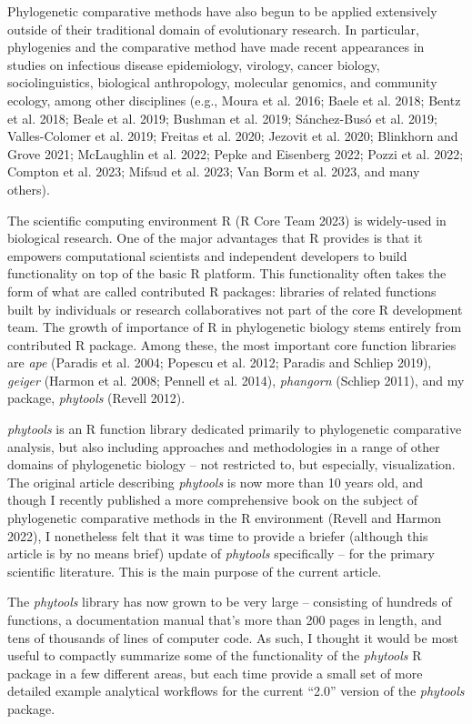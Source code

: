\documentclass[fleqn,10pt,lineno]{wlpeerj} %
\begin{document}
Phylogenetic comparative methods have also begun to be applied extensively outside of their traditional domain of evolutionary research. In particular, phylogenies and the comparative method have made recent appearances in studies on infectious disease epidemiology, virology, cancer biology, sociolinguistics, biological anthropology, molecular genomics, and community ecology, among other disciplines (e.g., Moura et al. 2016; Baele et al. 2018; Bentz et al. 2018; Beale et al. 2019; Bushman et al. 2019; Sánchez-Busó et al. 2019; Valles-Colomer et al. 2019; Freitas et al. 2020; Jezovit et al. 2020; Blinkhorn and Grove 2021; McLaughlin et al. 2022; Pepke and Eisenberg 2022; Pozzi et al. 2022; Compton et al. 2023; Mifsud et al. 2023; Van Borm et al. 2023, and many others).

The scientific computing environment R (R Core Team 2023) is widely-used in biological research. One of the major advantages that R provides is that it empowers computational scientists and independent developers to build functionality on top of the basic R platform. This functionality often takes the form of what are called contributed R packages: libraries of related functions built by individuals or research collaboratives not part of the core R development team. The growth of importance of R in phylogenetic biology stems entirely from contributed R package. Among these, the most important core function libraries are \emph{ape} (Paradis et al. 2004; Popescu et al. 2012; Paradis and Schliep 2019), \emph{geiger} (Harmon et al. 2008; Pennell et al. 2014), \emph{phangorn} (Schliep 2011), and my package, \emph{phytools} (Revell 2012).

\emph{phytools} is an R function library dedicated primarily to phylogenetic comparative analysis, but also including approaches and methodologies in a range of other domains of phylogenetic biology -- not restricted to, but especially, visualization. The original article describing \emph{phytools} is now more than 10 years old, and though I recently published a more comprehensive book on the subject of phylogenetic comparative methods in the R environment (Revell and Harmon 2022), I nonetheless felt that it was time to provide a briefer (although this article is by no means brief) update of \emph{phytools} specifically -- for the primary scientific literature. This is the main purpose of the current article.

The \emph{phytools} library has now grown to be very large -- consisting of hundreds of functions, a documentation manual that's more than 200 pages in length, and tens of thousands of lines of computer code. As such, I thought it would be most useful to compactly summarize some of the functionality of the \emph{phytools} R package in a few different areas, but each time provide a small set of more detailed example analytical workflows for the current ``2.0'' version of the \emph{phytools} package.
\end{document}

